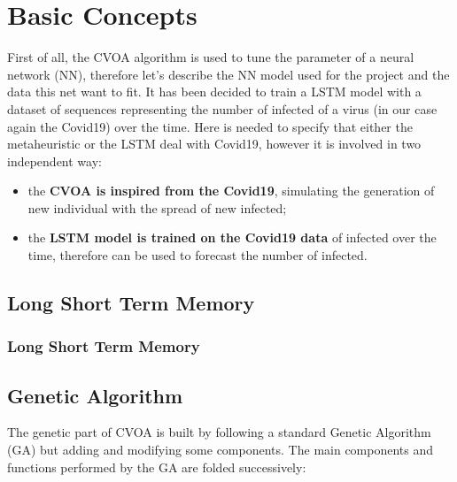 \documentclass[letterpaper]{article}%
\begin{document}
\section{Basic Concepts}
First of all, the CVOA algorithm is used to tune the parameter of a neural network (NN), therefore let's describe the NN model used for the project and the data this net want to fit.
It has been decided to train a LSTM model with a dataset of sequences representing the number of infected of a virus (in our case again the Covid19) over the time. Here is needed to specify that either the metaheuristic or the LSTM deal with Covid19, however it is involved in two independent way:
\begin{itemize}
	\item the \textbf{CVOA is inspired from the Covid19}, simulating the generation of new individual with the spread of new infected;
	\item the \textbf{LSTM model is trained on the Covid19 data} of infected over the time, therefore can be used to forecast the number of infected.
\end{itemize}


\subsection{Long Short Term Memory}
\subsubsection{Long Short Term Memory}


\subsection{Genetic Algorithm}
	The genetic part of CVOA is built by following a standard Genetic Algorithm (GA) but adding and modifying some components.
The main components and functions performed by the GA are folded successively:
\end{document}
